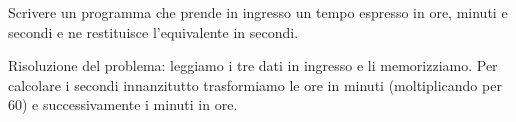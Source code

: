 \begin{Exercise}[label={ex:inv_tempo}]
  Scrivere un programma che prende in ingresso un tempo espresso in ore, minuti e secondi e ne restituisce l'equivalente in secondi.
\end{Exercise}

\begin{Answer}[ref={ex:inv_tempo}]
	Risoluzione del problema: leggiamo i tre dati in ingresso e li memorizziamo. Per calcolare i secondi innanzitutto trasformiamo le ore in minuti (moltiplicando per $60$) e successivamente i minuti in ore.
	
  
\end{Answer}
